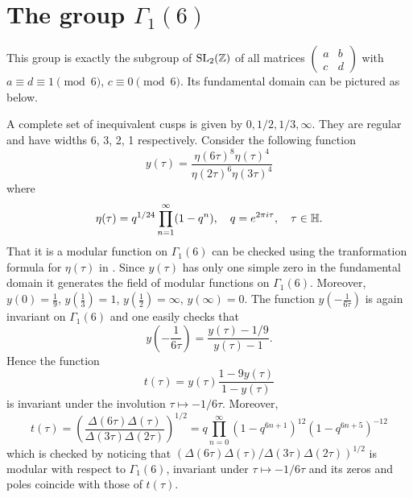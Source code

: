\section{The group $\Gamma_1(6)$}

This group is exactly the subgroup of $\mathrm{SL}_2(\mathbb{Z})$ of all matrices $(\begin{smallmatrix}
    a & b \\ c & d
\end{smallmatrix})$ with $a \equiv d \equiv 1 \pmod{6}$, $c \equiv 0 \pmod{6}$.
Its fundamental domain can be pictured as below.

\begin{center}
\end{center}
A complete set of inequivalent cusps is given by $0, 1/2, 1/3, \infty$.
They are regular and have widths 6, 3, 2, 1 respectively.
Consider the following function
$$
    y(\tau) = \frac{\eta(6\tau)^8 \eta(\tau)^4}{\eta(2\tau)^6 \eta(3\tau)^4}
$$
where
$$
    \eta(\tau) = q^{1/24} \prod_{n=1}^{\infty} (1 - q^n), \quad q = e^{2\pi i \tau}, \quad \tau \in \mathbb{H}.
$$
That it is a modular function on $\Gamma_1(6)$ can be checked using the tranformation formula for $\eta(\tau)$ in \cite[Ch 9]{rademacher2012topics}.
Since $y(\tau)$ has only one simple zero in the fundamental domain it generates the field of modular functions on $\Gamma_1(6)$.
Moreover, $y(0) = \frac{1}{9}$, $y(\frac{1}{3}) = 1$, $y(\frac{1}{2}) = \infty$, $y(\infty) = 0$.
The function $y(-\frac{1}{6\tau})$ is again invariant on $\Gamma_1(6)$ and one easily checks that
\begin{equation}
    \label{eqn:1}
    y\left(-\frac{1}{6\tau}\right) = \frac{y(\tau) - 1/9}{y(\tau) - 1}.
\end{equation}
Hence the function
$$
    t(\tau) = y(\tau) \frac{1 - 9y(\tau)}{1 - y(\tau)}
$$
is invariant under the involution $\tau \mapsto -1/6\tau$.
Moreover,
$$
    t(\tau) = \left(\frac{\Delta(6\tau) \Delta(\tau)}{\Delta(3\tau) \Delta(2\tau)}\right)^{1/2} = q \prod_{n = 0}^{\infty} (1 - q^{6n + 1})^{12} (1 - q^{6n + 5})^{-12}
$$
which is checked by noticing that $(\Delta(6\tau) \Delta(\tau) / \Delta(3\tau) \Delta(2\tau))^{1/2}$ is modular with respect to $\Gamma_1(6)$, invariant under $\tau \mapsto -1/6\tau$ and its zeros and poles coincide with those of $t(\tau)$.

